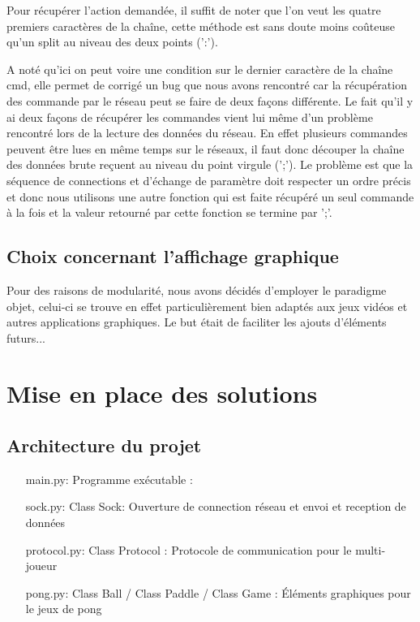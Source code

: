 \documentclass[12pt]{report}
\begin{document}
Pour récupérer l'action demandée, il suffit de noter que l'on veut les quatre premiers
caractères de la chaîne, cette méthode est sans doute moins coûteuse qu'un split
au niveau des deux points (':').

A noté qu'ici on peut voire une condition sur le dernier caractère de la chaîne
cmd, elle permet de corrigé un bug que nous avons rencontré car la récupération
des commande par le réseau peut se faire de deux façons différente.
Le fait qu'il y ai deux façons de récupérer les commandes vient lui même d'un
problème rencontré lors de la lecture des données du réseau. En effet
plusieurs commandes peuvent être lues en même temps sur le réseaux, il faut
donc découper la chaîne des données brute reçuent au niveau du point virgule
(';').
Le problème est que la séquence de connections et d'échange de paramètre doit
respecter un ordre précis et donc nous utilisons une autre fonction qui est
faite récupéré un seul commande à la fois et la valeur retourné par cette
fonction se termine par ';'.

\chapter{Choix concernant l'affichage graphique} 
Pour des raisons de modularité, nous avons décidés d'employer le
paradigme objet, celui-ci se trouve en effet particulièrement bien
adaptés aux jeux vidéos et autres applications graphiques. Le but
était de faciliter les ajouts d'éléments futurs...

\part{Mise en place des solutions}
\chapter{Architecture du projet}
\begin{itemize}
\item[main.py: ] Programme exécutable : 
\item[sock.py: ] Class Sock: Ouverture de connection réseau et envoi
  et reception de données 
\item[protocol.py: ] Class Protocol : Protocole de communication pour le
  multi-joueur
\item[pong.py: ] Class Ball / Class Paddle / Class Game : Éléments graphiques
  pour le jeux de pong 
\end{itemize}
\end{document}
